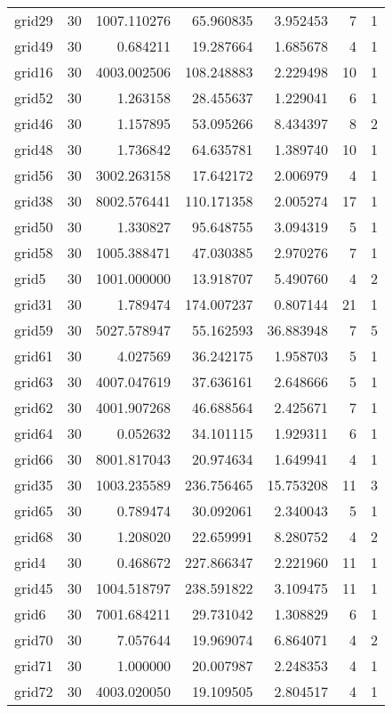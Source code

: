 \documentclass[../../../thesis.tex]{subfiles}
\begin{document}
\begin{longtable}{|l|r|r|r|r|r|r|}
grid29 & 30 & 1007.110276 & 65.960835 & 3.952453 & 7 & 1 \\
grid49 & 30 & 0.684211 & 19.287664 & 1.685678 & 4 & 1 \\
grid16 & 30 & 4003.002506 & 108.248883 & 2.229498 & 10 & 1 \\
grid52 & 30 & 1.263158 & 28.455637 & 1.229041 & 6 & 1 \\
grid46 & 30 & 1.157895 & 53.095266 & 8.434397 & 8 & 2 \\
grid48 & 30 & 1.736842 & 64.635781 & 1.389740 & 10 & 1 \\
grid56 & 30 & 3002.263158 & 17.642172 & 2.006979 & 4 & 1 \\
grid38 & 30 & 8002.576441 & 110.171358 & 2.005274 & 17 & 1 \\
grid50 & 30 & 1.330827 & 95.648755 & 3.094319 & 5 & 1 \\
grid58 & 30 & 1005.388471 & 47.030385 & 2.970276 & 7 & 1 \\
grid5 & 30 & 1001.000000 & 13.918707 & 5.490760 & 4 & 2 \\
grid31 & 30 & 1.789474 & 174.007237 & 0.807144 & 21 & 1 \\
grid59 & 30 & 5027.578947 & 55.162593 & 36.883948 & 7 & 5 \\
grid61 & 30 & 4.027569 & 36.242175 & 1.958703 & 5 & 1 \\
grid63 & 30 & 4007.047619 & 37.636161 & 2.648666 & 5 & 1 \\
grid62 & 30 & 4001.907268 & 46.688564 & 2.425671 & 7 & 1 \\
grid64 & 30 & 0.052632 & 34.101115 & 1.929311 & 6 & 1 \\
grid66 & 30 & 8001.817043 & 20.974634 & 1.649941 & 4 & 1 \\
grid35 & 30 & 1003.235589 & 236.756465 & 15.753208 & 11 & 3 \\
grid65 & 30 & 0.789474 & 30.092061 & 2.340043 & 5 & 1 \\
grid68 & 30 & 1.208020 & 22.659991 & 8.280752 & 4 & 2 \\
grid4 & 30 & 0.468672 & 227.866347 & 2.221960 & 11 & 1 \\
grid45 & 30 & 1004.518797 & 238.591822 & 3.109475 & 11 & 1 \\
grid6 & 30 & 7001.684211 & 29.731042 & 1.308829 & 6 & 1 \\
grid70 & 30 & 7.057644 & 19.969074 & 6.864071 & 4 & 2 \\
grid71 & 30 & 1.000000 & 20.007987 & 2.248353 & 4 & 1 \\
grid72 & 30 & 4003.020050 & 19.109505 & 2.804517 & 4 & 1 \\

\end{longtable}
\end{document}

